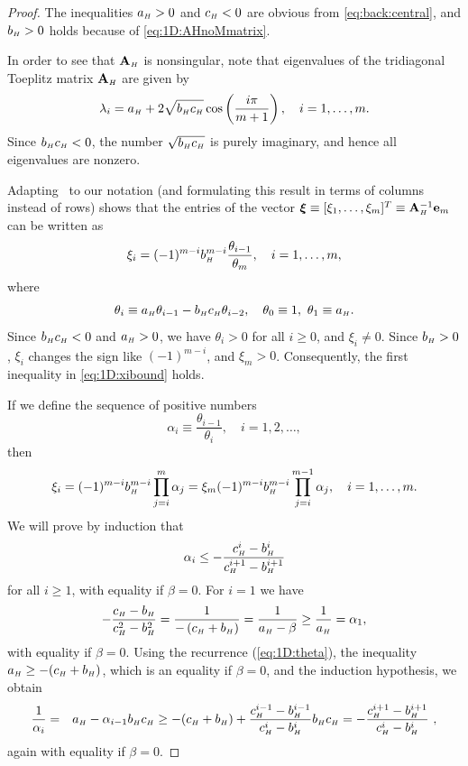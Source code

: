 \begin{proof}
The inequalities $a_{\scriptscriptstyle H}>0$ and $c_{\scriptscriptstyle H}<0$ are obvious from
\eqref{eq:back:central}, and $b_{\scriptscriptstyle H}>0$ holds because of \eqref{eq:1D:AHnoMmatrix}.

In order to see that $\mathbf{A}_{\scriptscriptstyle H}$ is nonsingular, note that eigenvalues of the
tridiagonal Toeplitz matrix $\mathbf{A}_{\scriptscriptstyle H}$ are given by
%
$$\lambda_{i}=a_{\scriptscriptstyle H}+2\sqrt{b_{\scriptscriptstyle H}c_{\scriptscriptstyle H}}\cos\left(\frac{i\pi}{m+1}\right),\quad i=1,\dots,m.$$
%
Since $b_{\scriptscriptstyle H}c_{\scriptscriptstyle H}<0$, the number $\sqrt{b_{\scriptscriptstyle H}c_{\scriptscriptstyle H}}$ is purely
imaginary, and hence all eigenvalues are nonzero.

Adapting~\cite[Theorem~2]{Usm94} to our notation (and formulating this result
in terms of columns instead of rows) shows that the entries of the vector
$\bm{\xi} \equiv [\xi_1,\dots,\xi_m]^T\equiv \mathbf{A}_{\scriptscriptstyle H}^{-1}\mathbf{e}_m$ can be written as
%
$$\xi_{i}=(-1)^{m-i}b_{\scriptscriptstyle H}^{m-i}\frac{\theta_{i-1}}{\theta_{m}}, \quad i=1,\dots,m,$$
%
where
%
\begin{equation}\label{eq:1D:theta}
\theta_{i} \equiv a_{\scriptscriptstyle H}\theta_{i-1}-b_{\scriptscriptstyle H}c_{\scriptscriptstyle H}\theta_{i-2},
\quad\theta_{0}\equiv 1,\ \theta_{1}\equiv a_{\scriptscriptstyle H}.
\end{equation}
%
Since $b_{\scriptscriptstyle H}c_{\scriptscriptstyle H}<0$ and $a_{\scriptscriptstyle H}>0$, we have $\theta_{i}>0$ for all
$i\geq 0$, and $\xi_{i}\neq 0$. Since $b_{\scriptscriptstyle H}>0$,
$\xi_{i}$ changes the sign like $(-1)^{m-i}$, and $\xi_{m}>0$.
Consequently, the first inequality in \eqref{eq:1D:xibound} holds.

If we define the sequence of positive numbers
%
$$\alpha_{i}\equiv\frac{\theta_{i-1}}{\theta_{i}},\quad i=1,2,\dots,$$
%
then
%
\begin{equation}\label{eq:1D:eqxi}
\xi_{i}  =  (-1)^{m-i}b_{\scriptscriptstyle H}^{m-i}\prod_{j=i}^{m}\alpha_{j}=
\xi_m (-1)^{m-i}b_{\scriptscriptstyle H}^{m-i}\prod_{j=i}^{m-1}\alpha_{j},\quad i=1,\dots,m.
\end{equation}
%
We will prove by induction that
%
\begin{equation}
\alpha_{i}\leq-\frac{c_{\scriptscriptstyle H}^{i}-b_{\scriptscriptstyle H}^{i}}{c_{\scriptscriptstyle H}^{i+1}-b_{\scriptscriptstyle H}^{i+1}}\label{eq:1D:alpha}
\end{equation}
%
for all $i\geq 1$, with equality if $\beta =0$. For $i=1$ we have
%
$$-\frac{c_{\scriptscriptstyle H}-b_{\scriptscriptstyle H}}{c_{\scriptscriptstyle H}^{2}-b_{\scriptscriptstyle H}^{2}}=
\frac{1}{-\left(c_{\scriptscriptstyle H}+b_{\scriptscriptstyle H}\right)}=\frac{1}{a_{\scriptscriptstyle H}-\beta}\geq\frac{1}{a_{\scriptscriptstyle H}}
=\alpha_{1},$$
%
with equality if $\beta=0$. Using the recurrence (\ref{eq:1D:theta}), the
inequality $a_{\scriptscriptstyle H}\geq-(c_{\scriptscriptstyle H}+b_{\scriptscriptstyle H})$, which is an equality if
$\beta=0$, and the induction hypothesis, we obtain
%
\begin{eqnarray*}
\frac{1}{\alpha_{i}} & = & a_{\scriptscriptstyle H}-\alpha_{i-1}b_{\scriptscriptstyle H}c_{\scriptscriptstyle H}
 \geq  -(c_{\scriptscriptstyle H}+b_{\scriptscriptstyle H})+\frac{c_{\scriptscriptstyle H}^{i-1}-b_{\scriptscriptstyle H}^{i-1}}{c_{\scriptscriptstyle H}^{i}-b_{\scriptscriptstyle H}^{i}}b_{\scriptscriptstyle H}c_{\scriptscriptstyle H}
  =  -\frac{c_{\scriptscriptstyle H}^{i+1}-b_{\scriptscriptstyle H}^{i+1}}{c_{\scriptscriptstyle H}^{i}-b_{\scriptscriptstyle H}^{i}} ~,
\end{eqnarray*}
%
again with equality if $\beta=0$.


\end{proof}
